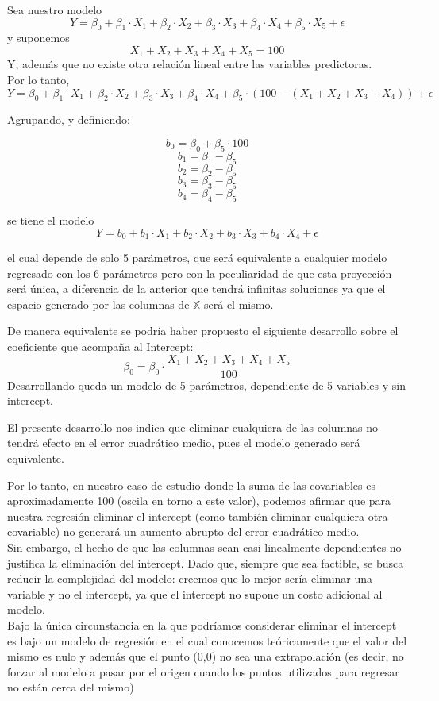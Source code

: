 Sea nuestro modelo 
$$
Y = \beta_{0} + \beta_{1} \cdot X_{1} + \beta_{2} \cdot X_{2} + \beta_{3} \cdot X_{3} + \beta_{4} \cdot X_{4}+ \beta_{5} \cdot X_{5} + \epsilon
$$
y suponemos 
$$X_1 + X_2 + X_3 + X_4 + X_5 = 100$$ 
Y, además que no existe otra relación lineal entre las variables predictoras.\\
Por lo tanto, 
$$
Y = \beta_{0} + \beta_{1} \cdot X_{1} + \beta_{2} \cdot X_{2} + \beta_{3} \cdot X_{3} + \beta_{4} \cdot X_{4}+ \beta_{5} \cdot (100 - (X_1 + X_2 + X_3 + X_4)) + \epsilon
$$

Agrupando, y definiendo:

$$
b_{0} = \beta_{0} + \beta_{5} \cdot 100
$$
$$
b_{1} = \beta_{1} - \beta_{5}
$$
$$
b_{2} = \beta_{2} - \beta_{5}
$$
$$
b_{3} = \beta_{3} - \beta_{5}
$$
$$
b_{4} = \beta_{4} - \beta_{5}
$$

se tiene el modelo 
$$
Y = b_{0} + b_{1} \cdot X_{1} + b_{2} \cdot X_{2} + b_{3} \cdot X_{3} + b_{4} \cdot X_{4} + \epsilon
$$

el cual depende de solo 5 parámetros, que será equivalente a cualquier modelo regresado con los 6 parámetros pero con la peculiaridad de que esta proyección será única, a diferencia de la anterior que tendrá infinitas soluciones ya que el espacio generado por las columnas de $\mathbb X$ será el mismo.

De manera equivalente se podría haber propuesto el siguiente desarrollo sobre el coeficiente que acompaña al Intercept:
$$
\beta_{0} = \beta_{0} \cdot \frac{X_1 + X_2 + X_3 + X_4 + X_5}{100}
$$
Desarrollando queda un modelo de 5 parámetros, dependiente de 5 variables y sin intercept.
\vskip0.2cm

El presente desarrollo nos indica que eliminar cualquiera de las columnas no tendrá efecto en el error cuadrático medio, pues el modelo generado será equivalente.

Por lo tanto, en nuestro caso de estudio donde la suma de las covariables es aproximadamente 100 (oscila en torno a este valor), podemos afirmar que para nuestra regresión eliminar el intercept (como también eliminar cualquiera otra covariable) no generará un aumento abrupto del error cuadrático medio.\\
Sin embargo, el hecho de que las columnas sean casi linealmente dependientes no justifica la eliminación del intercept. Dado que, siempre que sea factible, se busca reducir la complejidad del modelo: creemos que lo mejor sería eliminar una variable y no el intercept, ya que el intercept no supone un costo adicional al modelo.\\
Bajo la única circunstancia en la que podríamos considerar eliminar el intercept es bajo un modelo de regresión en el cual conocemos teóricamente que el valor del mismo es nulo y además que el punto (0,0) no sea una extrapolación (es decir, no forzar al modelo a pasar por el origen cuando los puntos utilizados para regresar no están cerca del mismo)